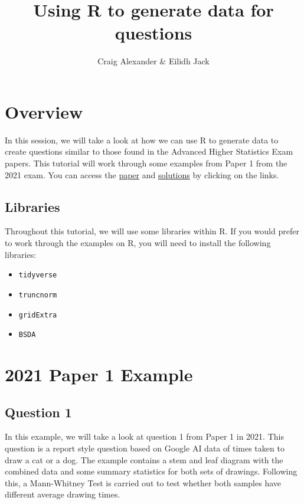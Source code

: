 \documentclass[
]{book}
\title{Using R to generate data for questions}
\author{Craig Alexander \& Eilidh Jack}
\date{}
\providecommand{\tightlist}{%
  \setlength{\itemsep}{0pt}\setlength{\parskip}{0pt}}
\begin{document}
\maketitle

{
\setcounter{tocdepth}{1}
\tableofcontents
}
\hypertarget{overview}{%
\chapter{Overview}\label{overview}}

In this session, we will take a look at how we can use R to generate data to create questions similar to those found in the Advanced Higher Statistics Exam papers. This tutorial will work through some examples from Paper 1 from the 2021 exam. You can access the \href{https://www.sqa.org.uk/sqa/files_ccc/NAH_Statistics_Paper1_2021.pdf}{paper} and \href{Advanced\%20Higher\%20Statistic\%20marking\%20instructions\%20paper\%201}{solutions} by clicking on the links.

\hypertarget{libraries}{%
\section{Libraries}\label{libraries}}

Throughout this tutorial, we will use some libraries within R. If you would prefer to work through the examples on R, you will need to install the following libraries:

\begin{itemize}
\tightlist
\item
  \texttt{tidyverse}
\item
  \texttt{truncnorm}
\item
  \texttt{gridExtra}
\item
  \texttt{BSDA}
\end{itemize}

\hypertarget{paper-1-example}{%
\chapter{2021 Paper 1 Example}\label{paper-1-example}}

\hypertarget{question-1}{%
\section{Question 1}\label{question-1}}

In this example, we will take a look at question 1 from Paper 1 in 2021. This question is a report style question based on Google AI data of times taken to draw a cat or a dog. The example contains a stem and leaf diagram with the combined data and some summary statistics for both sets of drawings. Following this, a Mann-Whitney Test is carried out to test whether both samples have different average drawing times.
\end{document}
